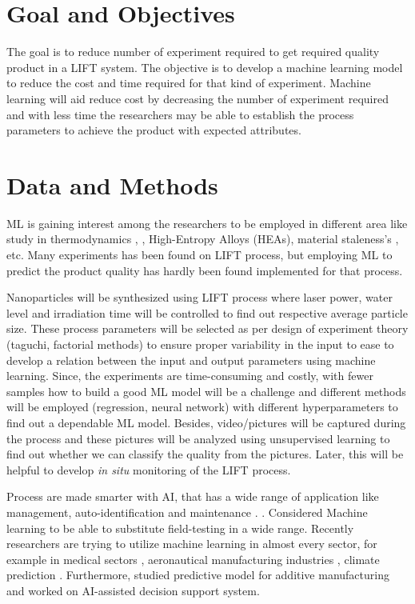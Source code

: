 \documentclass[letterpaper]{article}
\begin{document}
\section*{Goal and Objectives}
The goal is to reduce number of experiment required to get required quality product in a LIFT system. The objective is to develop a machine learning model to reduce the cost and time required for that kind of experiment. Machine learning will aid reduce cost by decreasing the number of experiment required and with less time the researchers may be able to establish the process parameters to achieve the product with expected attributes.
\pagebreak

\section*{Data and Methods}
ML is gaining interest among the researchers to be employed in different area like study in thermodynamics \parencite[]{ding}, \parencite[]{thermal},  High-Entropy Alloys (HEAs)\parencite[]{qiao}, material staleness's \parencite[]{he}, etc. Many experiments has been found on LIFT process, but employing ML to predict the product quality has hardly been found implemented for that process.\par
Nanoparticles will be synthesized using LIFT process where laser power, water level and irradiation time will be controlled to find out respective average particle size. These process parameters will be selected as per design of experiment theory (taguchi, factorial methods) to ensure proper variability in the input to ease to develop a relation between the input and output parameters using machine learning. Since, the experiments are time-consuming and costly, with fewer samples how to build a good ML model will be a challenge and different methods will be employed (regression, neural network) with different hyperparameters to find out a dependable ML model. Besides, video/pictures will be captured during the process and these pictures will be analyzed using unsupervised learning to find out whether we can classify the quality from the pictures. Later, this will be helpful to develop \textit{in situ} monitoring of the LIFT process.\par
Process are made smarter with AI, that has a wide range of application like management, auto-identification and maintenance \parencite[]{xu}. \parencite[]{bourhis}. Considered Machine learning to be able to substitute field-testing in a wide range. Recently researchers are trying to utilize machine learning in almost every sector, for example in medical sectors \parencite[]{twin}, aeronautical manufacturing industries \parencite[]{zohdi}, climate prediction \parencite[]{koc}.  Furthermore, \parencite[]{tapia}  studied predictive model for additive manufacturing and \parencite[]{kharchenko} worked on AI-assisted decision support system.
\end{document}
